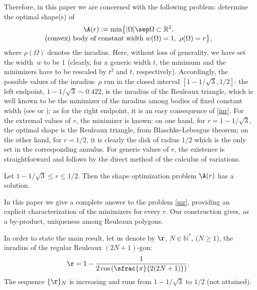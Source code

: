 Therefore, in this paper we are concerned with the following problem: determine the optimal shape(s) of\vspace*{-3pt}
\begin{multline}\label{mr}
\A(r):=\min \bigl\{|\Omega|\sep \Omega \subset \mathbb R^2,\\[-3pt] \hbox{(convex) body of constant width $w(\Omega)=1$},\ \rho(\Omega)=r\bigr\},
\end{multline}
where $\rho(\Omega)$ denotes the inradius. Here, without loss of generality, we have set the width~$w$ to be $1$ (clearly, for a generic width $t$, the minimum and the minimizers have to be rescaled by $t^2$ and $t$, respectively). Accordingly, the possible values of the inradius~$\rho$ run in the closed interval $[1-1/\sqrt{3}, 1/2]$:
{the left endpoint, $1-1/\sqrt{3} \sim 0.422$, is the inradius of the Reuleaux triangle, which is well known to be the minimizer of the inradius among bodies of fixed constant width (see \cite{BF}
or \cite{CG}); as for the right endpoint, it is an easy consequence of \eqref{inr}.}
For the extremal values of $r$, the minimizer is known: on one hand, for $r=1-1/\sqrt{3}$, the optimal shape is the Reuleaux triangle, from Blaschke-Lebesgue theorem; on the other hand, for $r=1/2$, it is clearly the disk of radius $1/2$ which is the only set in the corresponding annulus.
For generic values of $r$, the existence is straightforward and follows by the direct method of the calculus of variations.

\begin{proposition}[Existence]\label{prop1}
Let $1-1/\sqrt{3}\leq r \leq 1/2$. Then the shape optimization problem $\A(r)$ has a solution.
\end{proposition}

In this paper we give a complete answer to the problem \eqref{mr}, providing an explicit characterization of the minimizers for every $r$.
Our construction gives, as a by-product, uniqueness {among Reuleaux polygons}.

In order to state the main result, let us denote by $\r$, $N\in \mathbb N^*$, {($N\geq 1$)}, the inradius of the regular Reuleaux $(2N+1)$-gon:
\[
\r=1-\frac{1}{2\cos\left(\sfrac{\pi}{2(2N+1)}\right)}.
\]
The sequence $\{\r\}_N$ is increasing and runs from $1-1/\sqrt{3}$ to $1/2$ (not attained).

